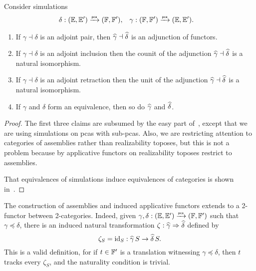 \begin{theorem}
  \label{th:applicative_adjunction_functor_adjunction}%
  Consider simulations
  \begin{align*}
    \delta &: (\EE, \subEE) \pcato (\FF, \subFF),
    &
    \gamma &: (\FF, \subFF) \pcato (\EE, \subEE).
  \end{align*}
  \begin{enumerate}
  \item If $\gamma \dashv \delta$ is an adjoint pair, then
    $\ff{\gamma} \dashv \ff{\delta}$ is an adjunction of functors.
  \item If $\gamma \dashv \delta$ is an adjoint inclusion then the counit of the adjunction $\ff{\gamma} \dashv \ff{\delta}$ is a natural isomorphism.
  \item If $\gamma \dashv \delta$ is an adjoint retraction then the unit of the adjunction $\ff{\gamma} \dashv \ff{\delta}$ is a natural isomorphism.
  \item If $\gamma$ and $\delta$ form an equivalence, then so do $\ff{\gamma}$ and
    $\ff{\delta}$.
  \end{enumerate}
\end{theorem}

\begin{proof}
  The first three claims are subsumed by the easy part of~\cite[Proposition 2.5.9]{Longley:94}, except that we are using simulations on pcas with sub-pcas. Also, we are restricting attention to categories of assemblies rather than realizability toposes, but this is not a problem because by applicative functors on realizability toposes restrict to assemblies.

  That equivalences of simulations induce equivalences of categories is shown in~\cite[Theorem 2.5.6]{Longley:94}.
\end{proof}

The construction of assemblies and induced applicative functors extends to a 2-functor between 2-categories. Indeed, given $\gamma, \delta : (\EE, \subEE) \pcato (\FF, \subFF)$ such that $\gamma \preceq \delta$, there is an induced natural transformation $\zeta : \ff{\gamma} \natto \ff{\delta}$ defined by
%
\begin{equation*}
  \zeta_{S} = \id[S] : \ff{\gamma}\,S \to \ff{\delta}\,S.
\end{equation*}
%
This is a valid definition, for if $t \in \subFF$ is a translation witnessing $\gamma \preceq \delta$, then $t$ tracks every $\zeta_{S}$, and the naturality condition is trivial.

